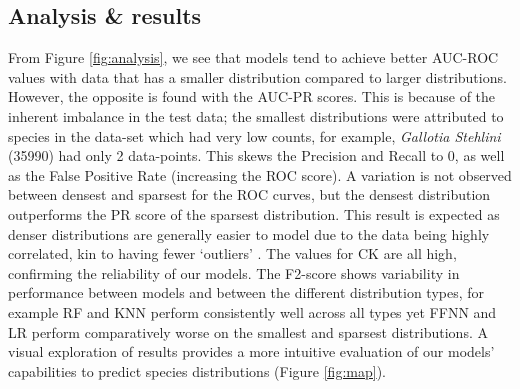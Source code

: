 \subsection{Analysis \& results}

From Figure \ref{fig:analysis}, we see that models tend to achieve better AUC-ROC values with data that has a smaller distribution compared to larger distributions. However, the opposite is found with the AUC-PR scores. This is because of the inherent imbalance in the test data; the smallest distributions were attributed to species in the data-set which had very low counts, for example, \emph{Gallotia Stehlini} (35990) had only 2 data-points. This skews the Precision and Recall to 0, as well as the False Positive Rate (increasing the ROC score). A variation is not observed between densest and sparsest for the ROC curves, but the densest distribution outperforms the PR score of the sparsest distribution. This result is expected as denser distributions are generally easier to model due to the data being highly correlated, kin to having fewer `outliers' \cite{ackerman2020detection}. The values for CK are all high, confirming the reliability of our models. The F2-score shows variability in performance between models and between the different distribution types, for example RF and KNN perform consistently well across all types yet FFNN and LR perform comparatively worse on the smallest and sparsest distributions. A visual exploration of results provides a more intuitive evaluation of our models' capabilities to predict species distributions (Figure \ref{fig:map}).

